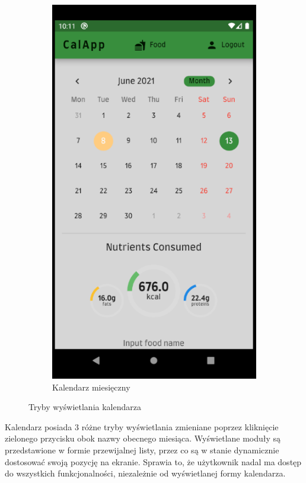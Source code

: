 \documentclass[12pt, a4paper]{article}
\begin{document}
\begin{sloppypar}
{{\begin{figure}[H]
\begin{subfigure}{.33\textwidth}
        \includegraphics[width=.95\linewidth]{screen_home_calendar3.PNG}
        \caption{Kalendarz miesięczny}
        \label{fig:screen_calendar3}
      \end{subfigure}%
      \caption{Tryby wyświetlania kalendarza}
      \label{fig:screens_calendar}
    \end{figure}

    Kalendarz posiada 3 różne tryby wyświetlania zmieniane poprzez kliknięcie zielonego
    przycisku obok nazwy obecnego miesiąca. Wyświetlane moduły są przedstawione w formie
    przewijalnej listy, przez co są w stanie dynamicznie dostosować swoją pozycję na ekranie.
    Sprawia to, że użytkownik nadal ma dostęp do wszystkich funkcjonalności, niezależnie od
    wyświetlanej formy kalendarza.

}}
\end{sloppypar}
\end{document}

